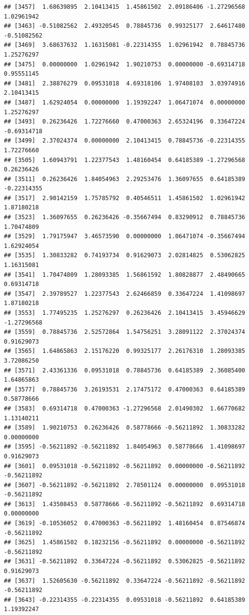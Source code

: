\documentclass[
]{article}
\begin{document}
\begin{verbatim}
## [3457]  1.68639895  2.10413415  1.45861502  2.09186406 -1.27296568  1.02961942
## [3463] -0.51082562  2.49320545  0.78845736  0.99325177  2.64617480 -0.51082562
## [3469]  3.68637632  1.16315081 -0.22314355  1.02961942  0.78845736  1.25276297
## [3475]  0.00000000  1.02961942  1.90210753  0.00000000 -0.69314718  0.95551145
## [3481]  2.38876279  0.09531018  4.69318106  1.97408103  3.03974916  2.10413415
## [3487]  1.62924054  0.00000000  1.19392247  1.06471074  0.00000000  1.25276297
## [3493]  0.26236426  1.72276660  0.47000363  2.65324196  0.33647224 -0.69314718
## [3499]  2.37024374  0.00000000  2.10413415  0.78845736 -0.22314355  1.72276660
## [3505]  1.60943791  1.22377543  1.48160454  0.64185389 -1.27296568  0.26236426
## [3511]  0.26236426  1.84054963  2.29253476  1.36097655  0.64185389 -0.22314355
## [3517]  2.90142159  1.75785792  0.40546511  1.45861502  1.02961942  1.87180218
## [3523]  1.36097655  0.26236426 -0.35667494  0.83290912  0.78845736  1.70474809
## [3529]  1.79175947  3.46573590  0.00000000  1.06471074 -0.35667494  1.62924054
## [3535]  1.30833282  0.74193734  0.91629073  2.02814825  0.53062825  1.16315081
## [3541]  1.70474809  1.28093385  1.56861592  1.80828877  2.48490665  0.69314718
## [3547]  2.39789527  1.22377543  2.62466859  0.33647224  1.41098697  1.87180218
## [3553]  1.77495235  1.25276297  0.26236426  2.10413415  3.45946629 -1.27296568
## [3559]  0.78845736  2.52572864  1.54756251  3.28091122  2.37024374  0.91629073
## [3565]  1.64865863  2.15176220  0.99325177  2.26176310  1.28093385  3.72086250
## [3571]  2.43361336  0.09531018  0.78845736  0.64185389  2.36085400  1.64865863
## [3577]  0.78845736  3.26193531  2.17475172  0.47000363  0.64185389  0.58778666
## [3583]  0.69314718  0.47000363 -1.27296568  2.01490302  1.66770682  1.13140211
## [3589]  1.90210753  0.26236426  0.58778666 -0.56211892  1.30833282  0.00000000
## [3595] -0.56211892 -0.56211892  1.84054963  0.58778666  1.41098697  0.91629073
## [3601]  0.09531018 -0.56211892 -0.56211892  0.00000000 -0.56211892 -0.56211892
## [3607] -0.56211892 -0.56211892  2.78501124  0.00000000  0.09531018 -0.56211892
## [3613]  1.43508453  0.58778666 -0.56211892 -0.56211892  0.69314718  0.00000000
## [3619] -0.10536052  0.47000363 -0.56211892  1.48160454  0.87546874 -0.56211892
## [3625]  1.45861502  0.18232156 -0.56211892  0.00000000 -0.56211892 -0.56211892
## [3631] -0.56211892  0.33647224 -0.56211892  0.53062825 -0.56211892  0.91629073
## [3637]  1.52605630 -0.56211892  0.33647224 -0.56211892 -0.56211892 -0.56211892
## [3643] -0.22314355 -0.22314355  0.09531018 -0.56211892  0.64185389  1.19392247

\end{verbatim}
\end{document}
